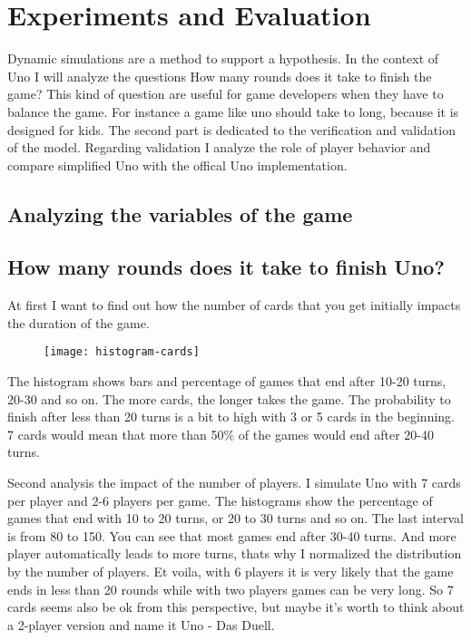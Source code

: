 
\section{Experiments and Evaluation}

Dynamic simulations are a method to support a hypothesis. In the context of Uno I will analyze the questions How many rounds does it take to finish the game?
This kind of question are useful for game developers when they have to balance the game. For instance a game like uno should take to long, because it is designed for kids.
The second part is dedicated to the verification and validation of the model. Regarding validation I analyze the role of player behavior and compare simplified Uno with the offical Uno implementation.

\subsection{Analyzing the variables of the game}



\subsection{How many rounds does it take to finish Uno?}

At first I want to find out how the number of cards that you get initially impacts the duration of the game. 

\begin{figure}[h!]
  \caption{}
  \texttt{[image: histogram-cards]}
\end{figure}


The histogram shows bars and percentage of games that end after 10-20 turns, 20-30 and so on. The more cards, the longer takes the game. The probability to finish after less than 20 turns is a bit to high with 3 or 5 cards in the beginning. 7 cards would mean that more than 50\% of the games would end after 20-40 turns.


Second analysis the impact of the number of players. I simulate Uno with 7 cards per player and 2-6 players per game. The histograms show the percentage of games that end with 10 to 20 turns, or 20 to 30 turns and so on. The last interval is from 80 to 150. You can see that most games end after 30-40 turns. And more player automatically leads to more turns, thats why I normalized the distribution by the number of players. Et voila, with 6 players it is very likely that the game ends in less than 20 rounds while with two players games can be very long. So 7 cards seems also be ok from this perspective, but maybe it’s worth to think about a 2-player version and name it Uno - Das Duell.


